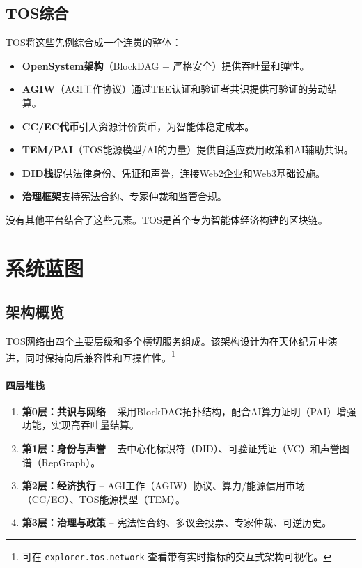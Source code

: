 \documentclass[11pt]{article}
\begin{document}
\subsection{TOS综合}
TOS将这些先例综合成一个连贯的整体：
\begin{itemize}[noitemsep]
  \item \textbf{OpenSystem架构}（BlockDAG + 严格安全）提供吞吐量和弹性。
  \item \textbf{AGIW}（AGI工作协议）通过TEE认证和验证者共识提供可验证的劳动结算。
  \item \textbf{CC/EC代币}引入资源计价货币，为智能体稳定成本。
  \item \textbf{TEM/PAI}（TOS能源模型/AI的力量）提供自适应费用政策和AI辅助共识。
  \item \textbf{DID栈}提供法律身份、凭证和声誉，连接Web2企业和Web3基础设施。
  \item \textbf{治理框架}支持宪法合约、专家仲裁和监管合规。
\end{itemize}

没有其他平台结合了这些元素。TOS是首个专为智能体经济构建的区块链。

\section{系统蓝图}
\subsection{架构概览}
TOS网络由四个主要层级和多个横切服务组成。该架构设计为在天体纪元中演进，同时保持向后兼容性和互操作性。\footnote{可在 \texttt{explorer.tos.network} 查看带有实时指标的交互式架构可视化。}

\paragraph{四层堆栈}
\begin{enumerate}[noitemsep]
  \item \textbf{第0层：共识与网络} -- 采用BlockDAG拓扑结构，配合AI算力证明（PAI）增强功能，实现高吞吐量结算。
  \item \textbf{第1层：身份与声誉} -- 去中心化标识符（DID）、可验证凭证（VC）和声誉图谱（RepGraph）。
  \item \textbf{第2层：经济执行} -- AGI工作（AGIW）协议、算力/能源信用市场（CC/EC）、TOS能源模型（TEM）。
  \item \textbf{第3层：治理与政策} -- 宪法性合约、多议会投票、专家仲裁、可逆历史。
\end{enumerate}
\end{document}
